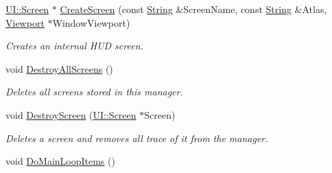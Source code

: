 \begin{DoxyCompactItemize}
\hyperlink{classphys_1_1UI_1_1Screen}{UI::Screen} $\ast$ \hyperlink{classphys_1_1UIManager_acbc318b4d152db7ba83201feb7d8ed12}{CreateScreen} (const \hyperlink{namespacephys_aa03900411993de7fbfec4789bc1d392e}{String} \&ScreenName, const \hyperlink{namespacephys_aa03900411993de7fbfec4789bc1d392e}{String} \&Atlas, \hyperlink{classphys_1_1Viewport}{Viewport} $\ast$WindowViewport)
\begin{DoxyCompactList}\small\item\em Creates an internal HUD screen. \item\end{DoxyCompactList}\item 
\hypertarget{classphys_1_1UIManager_a97555e02aad6c85cac6bf67fbe074cd1}{
void \hyperlink{classphys_1_1UIManager_a97555e02aad6c85cac6bf67fbe074cd1}{DestroyAllScreens} ()}
\label{classphys_1_1UIManager_a97555e02aad6c85cac6bf67fbe074cd1}

\begin{DoxyCompactList}\small\item\em Deletes all screens stored in this manager. \item\end{DoxyCompactList}\item 
void \hyperlink{classphys_1_1UIManager_a6c44c94905d7a01eb004efda66b53af8}{DestroyScreen} (\hyperlink{classphys_1_1UI_1_1Screen}{UI::Screen} $\ast$Screen)
\begin{DoxyCompactList}\small\item\em Deletes a screen and removes all trace of it from the manager. \item\end{DoxyCompactList}\item 
\hypertarget{classphys_1_1UIManager_a972abedcd4343dc5966580f2f82494a8}{
void \hyperlink{classphys_1_1UIManager_a972abedcd4343dc5966580f2f82494a8}{DoMainLoopItems} ()}
\label{classphys_1_1UIManager_a972abedcd4343dc5966580f2f82494a8}


\end{DoxyCompactItemize}
